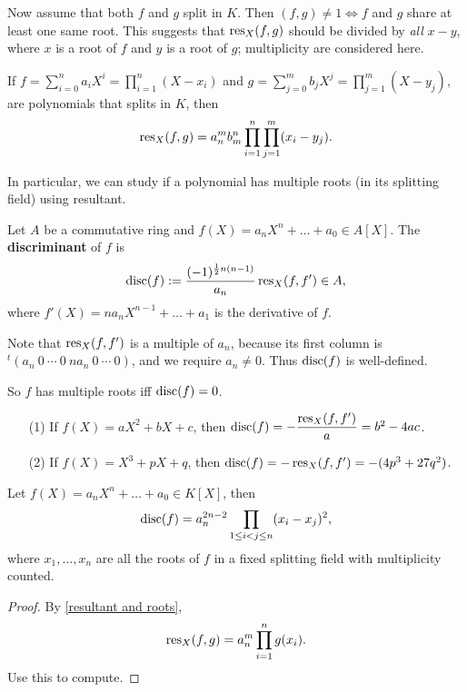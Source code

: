 Now assume that both $f$ and $g$ split in $K$.
Then $(f, g)\ne 1\iff f$ and $g$ share at least one same root. This suggests that $\operatorname{res}_X(f, g)$ should be divided by \textit{all} $x - y$, where $x$ is a root of $f$ and $y$ is a root of $g$; multiplicity are considered here.
\begin{theorem}\label{resultant and roots}
    If $f = \sum_{i=0}^{n}a_iX^i = \prod_{i=1}^n(X-x_i)$ and $g = \sum_{j = 0}^m b_jX^j = \prod_{j = 1}^m (X - y_j)$,
    are polynomials that splits in $K$,
    then \[\operatorname{res}_X(f, g) = a_n^mb_m^n\prod_{i=1}^n\prod_{j=1}^m (x_i - y_j).\]
\end{theorem}

In particular, we can study if a polynomial has multiple roots (in its splitting field) using resultant.
\begin{definition}
    Let $A$ be a commutative ring and $f(X) = a_nX^n + \dots + a_0\in A[X]$.
    The \textbf{discriminant} of $f$ is\[\operatorname{disc}(f) := \frac{(-1)^{\frac{1}{2}n(n-1)}}{a_n}\operatorname{res}_X(f, f')\in A,\]
    where $f'(X) = na_nX^{n - 1} + \dots + a_1$ is the derivative of $f$.

    Note that $\operatorname{res}_X(f, f')$ is a multiple of $a_n$,
    because its first column is $^t(a_n\ 0\ \cdots\ 0\ na_n\ 0\ \cdots\ 0)$, and we require $a_n\ne 0$. Thus $\operatorname{disc}(f)$ is well-defined.
\end{definition}
So $f$ has multiple roots iff $\operatorname{disc}(f) = 0$.
\begin{example}
    \begin{enumerate}
        \item [(1)] If $f(X) = aX^2 + bX + c$,
        then $\operatorname{disc}(f) = -\dfrac{\operatorname{res}_X(f, f')}{a} =b^2 - 4ac$.
        \item [(2)] If $f(X) = X^3 + pX + q$,
        then $\operatorname{disc}(f) = -\operatorname{res}_X(f, f') = -(4p^3 + 27q^2)$.
    \end{enumerate}
    \end{example}
    
\begin{proposition}\label{discriminant and roots}
    Let $f(X) = a_nX^n + \dots + a_0\in K[X]$,
    then \[\operatorname{disc}(f) = a_n^{2n-2}\prod_{1\le i < j\le n}(x_i - x_j)^2,\]
    where $x_1, \dots, x_n$ are all the roots of $f$ in a fixed splitting field with multiplicity counted.
\end{proposition}
\begin{proof}
    By \cref{resultant and roots},
    \[\operatorname{res}_X(f, g) = a_n^m\prod_{i = 1}^n g(x_i).\]
    Use this to compute.
\end{proof}
